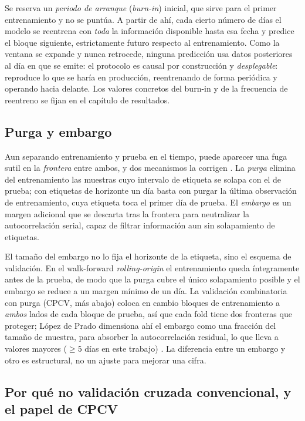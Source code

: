 Se reserva un \emph{periodo de arranque} (\emph{burn-in}) inicial, que sirve para el primer entrenamiento y no se puntúa. A partir de ahí, cada cierto número de días el modelo se reentrena con \emph{toda} la información disponible hasta esa fecha y predice el bloque siguiente, estrictamente futuro respecto al entrenamiento. Como la ventana se expande y nunca retrocede, ninguna predicción usa datos posteriores al día en que se emite: el protocolo es causal por construcción y \emph{desplegable}: reproduce lo que se haría en producción, reentrenando de forma periódica y operando hacia delante. Los valores concretos del burn-in y de la frecuencia de reentreno se fijan en el capítulo de resultados.

\subsection{Purga y embargo}
\label{sec:cpcv-purga}

Aun separando entrenamiento y prueba en el tiempo, puede aparecer una fuga sutil en la \emph{frontera} entre ambos, y dos mecanismos la corrigen \cite{lopezdeprado2018}. La \emph{purga} elimina del entrenamiento las muestras cuyo intervalo de etiqueta se solapa con el de prueba; con etiquetas de horizonte un día basta con purgar la última observación de entrenamiento, cuya etiqueta toca el primer día de prueba. El \emph{embargo} es un margen adicional que se descarta tras la frontera para neutralizar la autocorrelación serial, capaz de filtrar información aun sin solapamiento de etiquetas.

El tamaño del embargo no lo fija el horizonte de la etiqueta, sino el esquema de validación. En el walk-forward \emph{rolling-origin} el entrenamiento queda íntegramente antes de la prueba, de modo que la purga cubre el único solapamiento posible y el embargo se reduce a un margen mínimo de un día. La validación combinatoria con purga (CPCV, más abajo) coloca en cambio bloques de entrenamiento a \emph{ambos} lados de cada bloque de prueba, así que cada fold tiene dos fronteras que proteger; López de Prado dimensiona ahí el embargo como una fracción del tamaño de muestra, para absorber la autocorrelación residual, lo que lleva a valores mayores ($\ge 5$ días en este trabajo) \cite{lopezdeprado2018}. La diferencia entre un embargo y otro es estructural, no un ajuste para mejorar una cifra.

\subsection{Por qué no validación cruzada convencional, y el papel de CPCV}
\label{sec:cpcv-cpcv}

